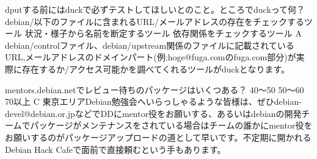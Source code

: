 \santaku
{dputする前にはduckで必ずテストしてほしいとのこと。ところでduckって何？}
{debian/以下のファイルに含まれるURL/メールアドレスの存在をチェックするツール}
{状況・様子から名前を断定するツール}
{依存関係をチェックするツール}
{A}
{debian/controlファイル、debian/upstream関係のファイルに記載されているURL,メールアドレスのドメインパート(例:hoge@fuga.comのfuga.com部分)が実際に存在するか/アクセス可能かを調べてくれるツールがduckとなります。}

\santaku
{mentors.debian.netでレビュー待ちのパッケージはいくつある？}
{40〜50}
{50〜60}
{70以上}
{C}
{東京エリアDebian勉強会へいらっしゃるような皆様は、ぜひdebian-devel@debian.or.jpなどでDDにmentor役をお願いする、あるいはdebianの開発チームでパッケージがメンテナンスをされている場合はチームの誰かにmentor役をお願いするのがパッケージアップロードの道として早いです。不定期に開かれるDebian Hack Cafeで面前で直接頼むという手もあります。}
